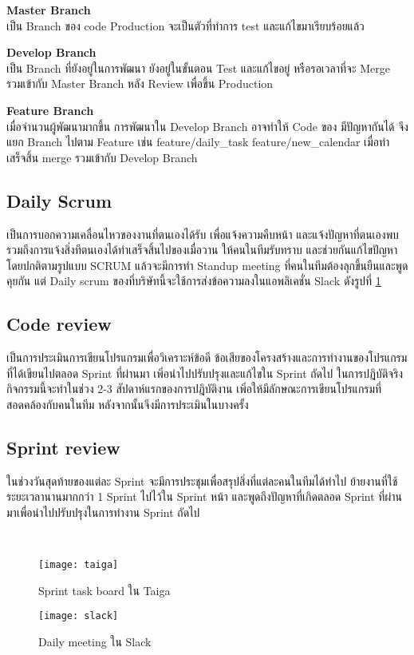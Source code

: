 \textbf{Master Branch}\\
เป็น Branch ของ code Production จะเป็นตัวที่ทำการ test และแก้ไขมาเรียบร้อยแล้ว

\textbf{Develop Branch} \\
เป็น Branch ที่ยังอยู่ในการพัฒนา ยังอยู่ในขั้นตอน Test และแก้ไขอยู่ หรือรอเวลาที่จะ Merge รวมเข้ากับ Master Branch หลัง Review เพื่อขึ้น Production

\textbf{Feature Branch}\\
เมื่อจำนวนผู้พัฒนามากขึ้น การพัฒนาใน Develop Branch อาจทำให้ Code ของ มีปัญหากันได้ จึงแยก Branch ไปตาม Feature เช่น feature/daily\_task feature/new\_calendar เมื่อทำเสร็จสิ้น merge รวมเข้ากับ Develop Branch



\subsection{Daily Scrum}
เป็นการบอกความเคลื่อนไหวของงานที่ตนเองได้รับ เพื่อแจ้งความคืบหน้า และแจ้งปัญหาที่ตนเองพบรวมถึงการแจ้งสิ่งทีตนเองได้ทำเสร็จสิ้นไปของเมื่อวาน ให้คนในทีมรับทราบ และช่วยกันแก้ไขปัญหา โดยปกติตามรูปแบบ SCRUM แล้วจะมีการทำ Standup meeting ที่คนในทีมต้องลุกขึ้นยืนและพูดคุยกัน แต่ Daily scrum ของที่บริษัทนี้จะใช้การส่งข้อความลงในแอพลิเคชั่น Slack ดังรูปที่ \ref{Fig:slack}

\subsection{Code review}
เป็นการประเมินการเขียนโปรแกรมเพื่อวิเคราะห์ข้อดี ข้อเสียของโครงสร้างและการทำงานของโปรแกรมที่ได้เขียนไปตลอด Sprint ที่ผ่านมา เพิ่อนำไปปรับปรุงและแก้ไขใน Sprint ถัดไป ในการปฎิบัติจริงกิจกรรมนี้จะทำในช่วง 2-3 สัปดาห์แรกของการปฎิบัติงาน เพิ่อให้มีลักษณะการเขียนโปรแกรมที่สอดคล้องกับคนในทีม หลังจากนั้นจึงมีการประเมินในบางครั้ง

\subsection{Sprint review}
ในช่วงวันสุดท้ายของแต่ละ Sprint จะมีการประชุมเพื่อสรุปสิ่งที่แต่ละคนในทีมได้ทำไป ย้ายงานที่ใช้ระยะเวลานานมากกว่า 1 Sprint ไปไว้ใน Sprint หน้า และพูดถึงปัญหาที่เกิดตลอด Sprint ที่ผ่านมาเพื่อนำไปปรับปรุงในการทำงาน Sprint ถัดไป

\
\begin{figure}[!h]
	\centering
	\texttt{[image: taiga]}
	\caption{Sprint task board ใน Taiga}
	\label{Fig:taiga}
	\centering
	\texttt{[image: slack]}
	\caption{Daily meeting ใน Slack}
	\label{Fig:slack}
\end{figure}